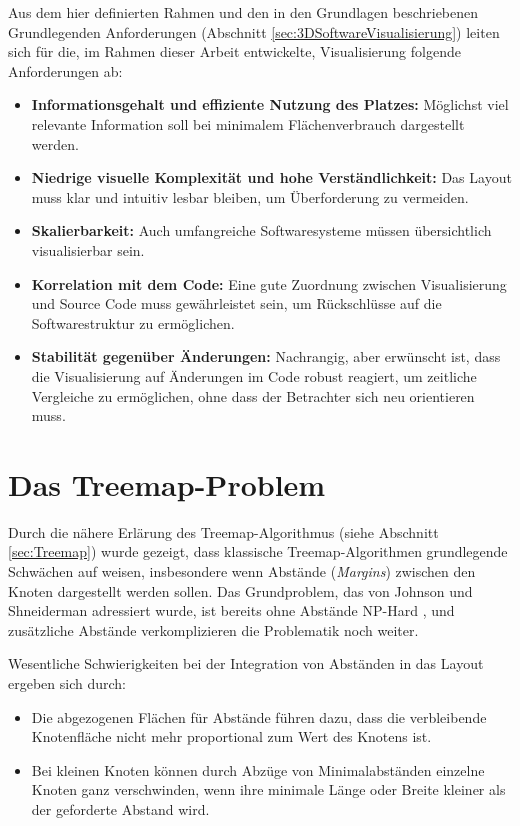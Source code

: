\smallskip

Aus dem hier definierten Rahmen und den in den Grundlagen beschriebenen Grundlegenden Anforderungen (Abschnitt \ref{sec:3DSoftwareVisualisierung}) leiten sich für die, im Rahmen dieser Arbeit entwickelte, Visualisierung folgende Anforderungen ab:

\begin{itemize}
    \item \textbf{Informationsgehalt und effiziente Nutzung des Platzes:} Möglichst viel relevante Information soll bei minimalem Flächenverbrauch dargestellt werden.
    \item \textbf{Niedrige visuelle Komplexität und hohe Verständlichkeit:} Das Layout muss klar und intuitiv lesbar bleiben, um Überforderung zu vermeiden.
    \item \textbf{Skalierbarkeit:} Auch umfangreiche Softwaresysteme müssen übersichtlich visualisierbar sein.
    \item \textbf{Korrelation mit dem Code:} Eine gute Zuordnung zwischen Visualisierung und Source Code muss gewährleistet sein, um Rückschlüsse auf die Softwarestruktur zu ermöglichen.
    \item \textbf{Stabilität gegenüber Änderungen:} Nachrangig, aber erwünscht ist, dass die Visualisierung auf Änderungen im Code robust reagiert, um zeitliche Vergleiche zu ermöglichen, ohne dass der Betrachter sich neu orientieren muss.
\end{itemize}

\section{Das Treemap-Problem} \label{sec:TreemapProblem}

Durch die nähere Erlärung des Treemap-Algorithmus (siehe Abschnitt \ref{sec:Treemap}) wurde gezeigt, dass klassische Treemap-Algorithmen grundlegende Schwächen auf weisen, insbesondere wenn Abstände (\textit{Margins}) zwischen den Knoten dargestellt werden sollen. Das Grundproblem, das von Johnson und Shneiderman \cite{johnson1991tree} adressiert wurde, ist bereits ohne Abstände NP-Hard \cite[3]{bruls2000squarified}, und zusätzliche Abstände verkomplizieren die Problematik noch weiter.

Wesentliche Schwierigkeiten bei der Integration von Abständen in das Layout ergeben sich durch:
\begin{itemize}
    \item Die abgezogenen Flächen für Abstände führen dazu, dass die verbleibende Knotenfläche nicht mehr proportional zum Wert des Knotens ist.
    \item Bei kleinen Knoten können durch Abzüge von Minimalabständen einzelne Knoten ganz verschwinden, wenn ihre minimale Länge oder Breite kleiner als der geforderte Abstand wird.
\end{itemize}

